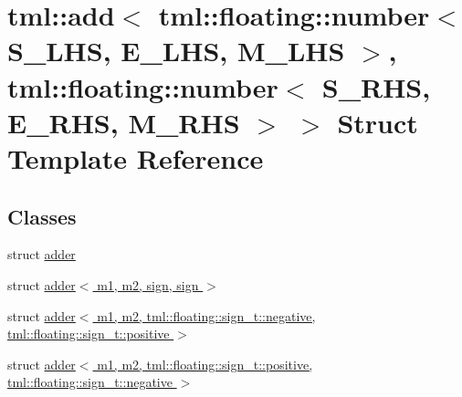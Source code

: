 \hypertarget{structtml_1_1add_3_01tml_1_1floating_1_1number_3_01_s___l_h_s_00_01_e___l_h_s_00_01_m___l_h_s_01f5ea122b4a29987e9df4655966e7e279}{\section{tml\+:\+:add$<$ tml\+:\+:floating\+:\+:number$<$ S\+\_\+\+L\+H\+S, E\+\_\+\+L\+H\+S, M\+\_\+\+L\+H\+S $>$, tml\+:\+:floating\+:\+:number$<$ S\+\_\+\+R\+H\+S, E\+\_\+\+R\+H\+S, M\+\_\+\+R\+H\+S $>$ $>$ Struct Template Reference}
\label{structtml_1_1add_3_01tml_1_1floating_1_1number_3_01_s___l_h_s_00_01_e___l_h_s_00_01_m___l_h_s_01f5ea122b4a29987e9df4655966e7e279}
}
\subsection*{Classes}
\begin{DoxyCompactItemize}
\item 
struct \hyperlink{structtml_1_1add_3_01tml_1_1floating_1_1number_3_01_s___l_h_s_00_01_e___l_h_s_00_01_m___l_h_s_0118f2f1531f1eb3eb6f65de97c3904eca}{adder}
\item 
struct \hyperlink{structtml_1_1add_3_01tml_1_1floating_1_1number_3_01_s___l_h_s_00_01_e___l_h_s_00_01_m___l_h_s_01f521c9b97955ece83ec0ef486d83a012}{adder$<$ m1, m2, sign, sign $>$}
\item 
struct \hyperlink{structtml_1_1add_3_01tml_1_1floating_1_1number_3_01_s___l_h_s_00_01_e___l_h_s_00_01_m___l_h_s_01092b317c83488a1c5a1535bde017143b}{adder$<$ m1, m2, tml\+::floating\+::sign\+\_\+t\+::negative, tml\+::floating\+::sign\+\_\+t\+::positive $>$}
\item 
struct \hyperlink{structtml_1_1add_3_01tml_1_1floating_1_1number_3_01_s___l_h_s_00_01_e___l_h_s_00_01_m___l_h_s_012f891e05bc1eb57b4be51c977e00b324}{adder$<$ m1, m2, tml\+::floating\+::sign\+\_\+t\+::positive, tml\+::floating\+::sign\+\_\+t\+::negative $>$}
\end{DoxyCompactItemize}
